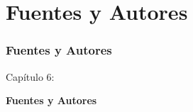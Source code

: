 %

\section{Fuentes y Autores}
\begin{frame}[fragile]
	\frametitle{Fuentes y Autores}

	\begin{center}\huge{Capítulo 6:}\end{center}
	\begin{center}\huge{\color{typo3darkgrey}\textbf{Fuentes y Autores}}\end{center}

\end{frame}


